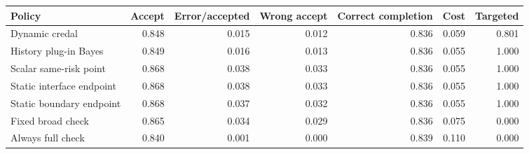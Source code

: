 \begin{tabular}{@{}lrrrrrr@{}}
\toprule
Policy & Accept & Error/accepted & Wrong accept & Correct completion & Cost & Targeted\\
\midrule
Dynamic credal & 0.848 & 0.015 & 0.012 & 0.836 & 0.059 & 0.801\\
History plug-in Bayes & 0.849 & 0.016 & 0.013 & 0.836 & 0.055 & 1.000\\
Scalar same-risk point & 0.868 & 0.038 & 0.033 & 0.836 & 0.055 & 1.000\\
Static interface endpoint & 0.868 & 0.038 & 0.033 & 0.836 & 0.055 & 1.000\\
Static boundary endpoint & 0.868 & 0.037 & 0.032 & 0.836 & 0.055 & 1.000\\
Fixed broad check & 0.865 & 0.034 & 0.029 & 0.836 & 0.075 & 0.000\\
Always full check & 0.840 & 0.001 & 0.000 & 0.839 & 0.110 & 0.000\\
\bottomrule
\end{tabular}
